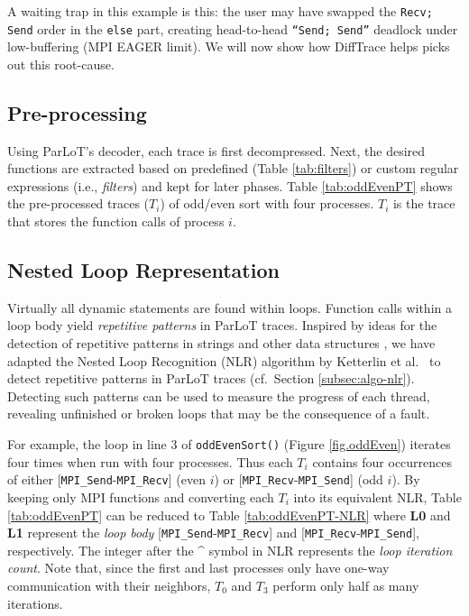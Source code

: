 A waiting trap in this example is this: the user may have
swapped the {\tt Recv; Send} order in the {\tt else} part,
creating head-to-head {\tt ``Send; Send''} deadlock
under low-buffering (MPI EAGER limit).
%
We will now show how DiffTrace helps picks out this root-cause.

\subsection{Pre-processing}

Using ParLoT's decoder, each trace is first decompressed.
Next, the desired functions are extracted based on predefined
(Table \ref{tab:filters}) or custom regular expressions
(i.e., \textit{filters}) and kept for later phases.
%
Table \ref{tab:oddEvenPT} shows the pre-processed traces ($T_i$) of odd/even sort with four processes.
$T_i$ is the trace that stores the function calls of process $i$.


\subsection{Nested Loop Representation}



Virtually all dynamic statements are found within loops.
%
Function calls within a loop body yield \textit{repetitive patterns}
in ParLoT traces.
%
Inspired by ideas for the detection of repetitive patterns in strings \cite{nakamura_fast_2013}
and other data structures \cite{kmr},
we have adapted the Nested Loop Recognition (NLR) algorithm by Ketterlin et al.~\cite{Ketterlin-nlr}
to detect repetitive patterns in ParLoT traces (cf.~Section \ref{subsec:algo-nlr}).
Detecting such patterns can be used to measure the progress of each thread,
revealing unfinished or broken loops that may be the consequence of a fault.

For example, the loop in line 3 of \texttt{oddEvenSort()} (Figure \ref{fig.oddEven}) iterates
four times when run with four processes.
Thus each $T_i$ contains four occurrences of either [\texttt{MPI\_Send}-\texttt{MPI\_Recv}] (even $i$)
or [\texttt{MPI\_Recv}-\texttt{MPI\_Send}] (odd $i$).
By keeping only MPI functions and converting each $T_i$ into its equivalent NLR,
Table \ref{tab:oddEvenPT} can be reduced to Table \ref{tab:oddEvenPT-NLR} where \textbf{L0} and \textbf{L1}
represent the \textit{loop body} [\texttt{MPI\_Send}-\texttt{MPI\_Recv}] and
[\texttt{MPI\_Recv}-\texttt{MPI\_Send}], respectively.
The integer after the \^{} symbol in NLR represents the \textit{loop iteration count}.
Note that, since the first and last processes only have one-way communication with their neighbors,
$T_0$ and $T_3$ perform only half as many iterations.


